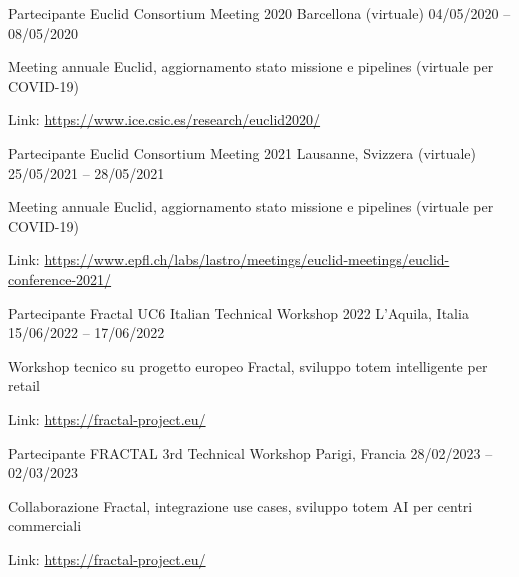 \begin{cventries}

\cventry
{Partecipante} %
{Euclid Consortium Meeting 2020} %
{Barcellona (virtuale)} %
{04/05/2020 -- 08/05/2020} %
{ %
\begin{cvitems}
\item {Meeting annuale Euclid, aggiornamento stato missione e pipelines (virtuale per COVID-19)}
\item {Link: \url{https://www.ice.csic.es/research/euclid2020/}}
\end{cvitems}
}


\cventry
{Partecipante} %
{Euclid Consortium Meeting 2021} %
{Lausanne, Svizzera (virtuale)} %
{25/05/2021 -- 28/05/2021} %
{ %
\begin{cvitems}
\item {Meeting annuale Euclid, aggiornamento stato missione e pipelines (virtuale per COVID-19)}
\item {Link: \url{https://www.epfl.ch/labs/lastro/meetings/euclid-meetings/euclid-conference-2021/}}
\end{cvitems}
}


\cventry
{Partecipante} %
{Fractal UC6 Italian Technical Workshop 2022} %
{L'Aquila, Italia} %
{15/06/2022 -- 17/06/2022} %
{ %
\begin{cvitems}
\item {Workshop tecnico su progetto europeo Fractal, sviluppo totem intelligente per retail}
\item {Link: \url{https://fractal-project.eu/}}
\end{cvitems}
}


\cventry
{Partecipante} %
{FRACTAL 3rd Technical Workshop} %
{Parigi, Francia} %
{28/02/2023 -- 02/03/2023} %
{ %
\begin{cvitems}
\item {Collaborazione Fractal, integrazione use cases, sviluppo totem AI per centri commerciali}
\item {Link: \url{https://fractal-project.eu/}}
\end{cvitems}
}


\end{cventries}